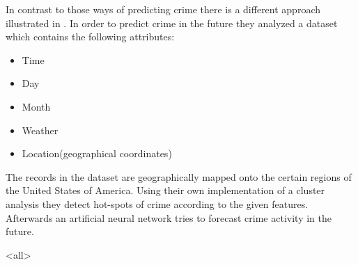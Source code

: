 \noindent In contrast to those ways of predicting crime there is a
different approach illustrated in \cite{forecast}. In order to predict
crime in the future they analyzed a dataset which contains the
following attributes:
\begin{itemize}
	\setlength{\itemsep}{-2pt}
	\item Time
	\item Day
	\item Month
	\item Weather
	\item Location(geographical coordinates) 
\end{itemize}
The records in the dataset are geographically mapped onto the certain
regions of the United States of America. Using their own
implementation of a cluster analysis they detect hot-spots of crime
according to the given features. Afterwards an artificial neural
network tries to forecast crime activity in the future.


\mode<all>
